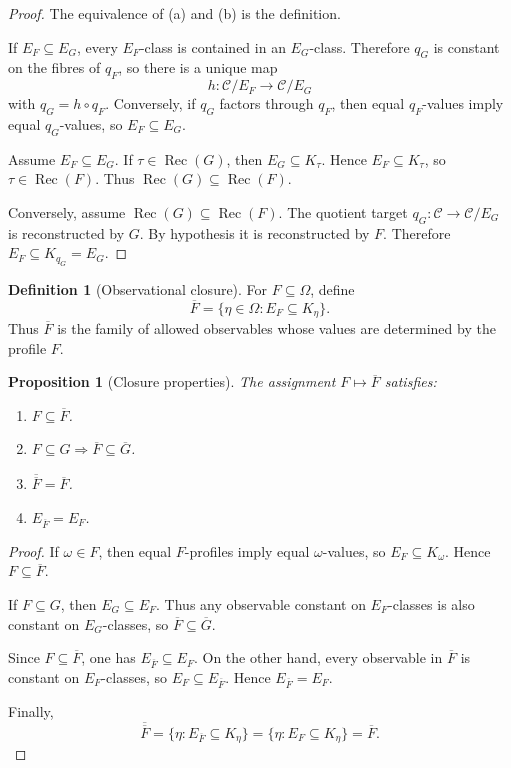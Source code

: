\documentclass[11pt]{article}
\newtheorem{proposition}[theorem]{Proposition}
\theoremstyle{definition}
\newtheorem{definition}[theorem]{Definition}
\theoremstyle{remark}
\begin{document}
\begin{proof}
The equivalence of (a) and (b) is the definition.

If \(E_F\subseteq E_G\), every \(E_F\)-class is contained in an \(E_G\)-class.  Therefore \(q_G\) is constant on the fibres of \(q_F\), so there is a unique map
\[
h:\mathcal C/E_F\to\mathcal C/E_G
\]
with \(q_G=h\circ q_F\).  Conversely, if \(q_G\) factors through \(q_F\), then equal \(q_F\)-values imply equal \(q_G\)-values, so \(E_F\subseteq E_G\).

Assume \(E_F\subseteq E_G\).  If \(\tau\in\operatorname{Rec}(G)\), then \(E_G\subseteq K_\tau\).  Hence \(E_F\subseteq K_\tau\), so \(\tau\in\operatorname{Rec}(F)\).  Thus \(\operatorname{Rec}(G)\subseteq\operatorname{Rec}(F)\).

Conversely, assume \(\operatorname{Rec}(G)\subseteq\operatorname{Rec}(F)\).  The quotient target \(q_G:\mathcal C\to\mathcal C/E_G\) is reconstructed by \(G\).  By hypothesis it is reconstructed by \(F\).  Therefore \(E_F\subseteq K_{q_G}=E_G\).
\end{proof}

\begin{definition}[Observational closure]
For \(F\subseteq\Omega\), define
\[
\overline F=
\{\eta\in\Omega:E_F\subseteq K_\eta\}.
\]
Thus \(\overline F\) is the family of allowed observables whose values are determined by the profile \(F\).
\end{definition}

\begin{proposition}[Closure properties]
The assignment \(F\mapsto \overline F\) satisfies:
\begin{enumerate}[label=(\alph*)]
\item \(F\subseteq\overline F\).
\item \(F\subseteq G\Rightarrow\overline F\subseteq\overline G\).
\item \(\overline{\overline F}=\overline F\).
\item \(E_{\overline F}=E_F\).
\end{enumerate}
\end{proposition}

\begin{proof}
If \(\omega\in F\), then equal \(F\)-profiles imply equal \(\omega\)-values, so \(E_F\subseteq K_\omega\).  Hence \(F\subseteq\overline F\).

If \(F\subseteq G\), then \(E_G\subseteq E_F\).  Thus any observable constant on \(E_F\)-classes is also constant on \(E_G\)-classes, so \(\overline F\subseteq\overline G\).

Since \(F\subseteq\overline F\), one has \(E_{\overline F}\subseteq E_F\).  On the other hand, every observable in \(\overline F\) is constant on \(E_F\)-classes, so \(E_F\subseteq E_{\overline F}\).  Hence \(E_{\overline F}=E_F\).

Finally,
\[
\overline{\overline F}
=\{\eta:E_{\overline F}\subseteq K_\eta\}
=\{\eta:E_F\subseteq K_\eta\}
=\overline F.
\]
\end{proof}
\end{document}

